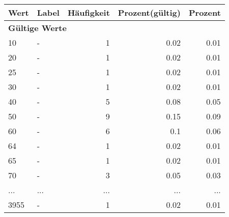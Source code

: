      \begin{longtable}{lXrrr}
     \toprule
     \textbf{Wert} & \textbf{Label} & \textbf{Häufigkeit} & \textbf{Prozent(gültig)} & \textbf{Prozent} \\
     \endhead
     \midrule
     \multicolumn{5}{l}{\textbf{Gültige Werte}}\\
        10 & \multicolumn{1}{X}{-} & %
          \num{1} &
          \num[round-mode=places,round-precision=2]{0,02} &
          \num[round-mode=places,round-precision=2]{0,01} \\
        20 & \multicolumn{1}{X}{-} & %
          \num{1} &
          \num[round-mode=places,round-precision=2]{0,02} &
          \num[round-mode=places,round-precision=2]{0,01} \\
        25 & \multicolumn{1}{X}{-} & %
          \num{1} &
          \num[round-mode=places,round-precision=2]{0,02} &
          \num[round-mode=places,round-precision=2]{0,01} \\
        30 & \multicolumn{1}{X}{-} & %
          \num{1} &
          \num[round-mode=places,round-precision=2]{0,02} &
          \num[round-mode=places,round-precision=2]{0,01} \\
        40 & \multicolumn{1}{X}{-} & %
          \num{5} &
          \num[round-mode=places,round-precision=2]{0,08} &
          \num[round-mode=places,round-precision=2]{0,05} \\
        50 & \multicolumn{1}{X}{-} & %
          \num{9} &
          \num[round-mode=places,round-precision=2]{0,15} &
          \num[round-mode=places,round-precision=2]{0,09} \\
        60 & \multicolumn{1}{X}{-} & %
          \num{6} &
          \num[round-mode=places,round-precision=2]{0,1} &
          \num[round-mode=places,round-precision=2]{0,06} \\
        64 & \multicolumn{1}{X}{-} & %
          \num{1} &
          \num[round-mode=places,round-precision=2]{0,02} &
          \num[round-mode=places,round-precision=2]{0,01} \\
        65 & \multicolumn{1}{X}{-} & %
          \num{1} &
          \num[round-mode=places,round-precision=2]{0,02} &
          \num[round-mode=places,round-precision=2]{0,01} \\
        70 & \multicolumn{1}{X}{-} & %
          \num{3} &
          \num[round-mode=places,round-precision=2]{0,05} &
          \num[round-mode=places,round-precision=2]{0,03} \\
       ... & ... & ... & ... & ... \\
        3955 & \multicolumn{1}{X}{-} & %
          \num{1} &
          \num[round-mode=places,round-precision=2]{0,02} &
          \num[round-mode=places,round-precision=2]{0,01} \\


\end{longtable}
